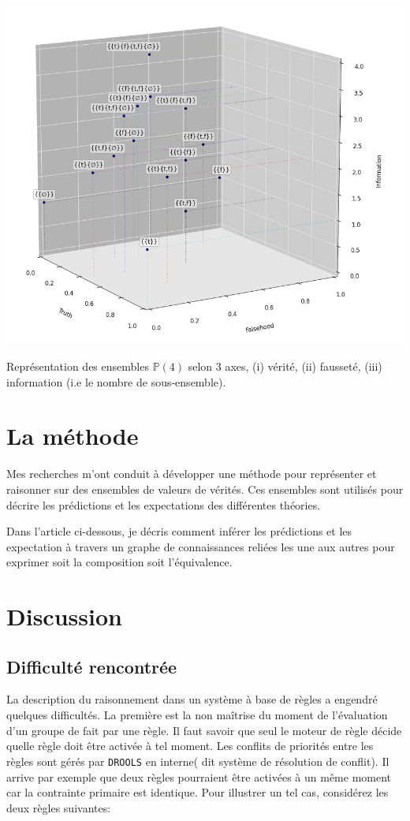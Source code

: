 \begin{refsegment}
\begin{shadedfigure}[H]
    \centering
    \includegraphics[width=\textwidth]{img/set_3d.png}
    \caption{Représentation des ensembles  $\mathbb{P}(4)$ selon 3 axes, (i) vérité, (ii) fausseté, (iii) information (i.e le nombre de sous-ensemble).}
    \label{fig:set3d}
\end{shadedfigure}

\section{La méthode}\label{sec:methode}

Mes recherches m'ont conduit à développer une méthode pour représenter et raisonner sur des ensembles de valeurs de vérités. Ces ensembles sont utilisés pour décrire les prédictions et les expectations des différentes théories.

Dans l'article ci-dessous, je décris comment inférer les prédictions et les expectation à travers un graphe de connaissances reliées les une aux autres pour exprimer soit la composition soit l'équivalence.




\section{Discussion}
\subsection{Difficulté rencontrée}
La description du raisonnement dans un système à base de règles a engendré quelques difficultés. La première est la non maîtrise du moment de l'évaluation d'un groupe de fait par une règle. Il faut savoir que seul le moteur de règle décide quelle règle doit être activée à tel moment. Les conflits de priorités entre les règles sont gérés par \texttt{DROOLS} en interne( dit système de résolution de conflit). Il arrive par exemple que deux règles pourraient être activées à un même moment car la contrainte primaire est identique. Pour illustrer un tel cas, considérez les deux règles suivantes:


\end{refsegment}
